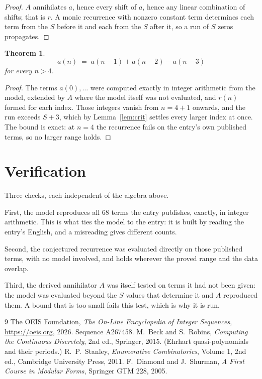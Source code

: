 \documentclass[11pt,a4paper]{article}
\theoremstyle{plain}
\newtheorem{theorem}{Theorem}
\theoremstyle{definition}
\begin{document}
\begin{proof}
$A$ annihilates $a$, hence every shift of $a$, hence any linear combination of shifts; that is
$r$. A monic recurrence with nonzero constant term determines each term from the $S$ before it
and each from the $S$ after it, so a run of $S$ zeros propagates.
\end{proof}

\begin{theorem}
\[
a(n)\;=\;a(n-1) + a(n-2) - a(n-3)
\]
for every $n>4$.
\end{theorem}

\begin{proof}
The terms $a(0),\dots$ were computed exactly in integer arithmetic from the model, extended by
$A$ where the model itself was not evaluated, and $r(n)$ formed for each index. Those integers
vanish from $n=4+1$ onwards, and the run exceeds $S+3$, which by
Lemma~\ref{lem:crit} settles every larger index at once. The bound is exact: at $n=4$ the recurrence fails on the entry's own published terms, so no larger range holds.
\end{proof}

\section{Verification}

Three checks, each independent of the algebra above.

First, the model reproduces all $68$ terms the entry publishes, exactly, in integer
arithmetic. This is what ties the model to the entry: it is built by reading the entry's
English, and a misreading gives different counts.

Second, the conjectured recurrence was evaluated directly on those published terms, with no
model involved, and holds wherever the proved range and the data overlap.

Third, the derived annihilator $A$ was itself tested on terms it had not been given: the model
was evaluated beyond the $S$ values that determine it and $A$ reproduced them. A bound that is
too small fails this test, which is why it is run.

\begin{thebibliography}{9}
 The OEIS Foundation, \emph{The On-Line Encyclopedia of Integer
Sequences}, \url{https://oeis.org}, 2026. Sequence A267458.
 M.~Beck and S.~Robins, \emph{Computing the Continuous Discretely},
2nd ed., Springer, 2015. (Ehrhart quasi-polynomials and their periods.)
 R.~P.~Stanley, \emph{Enumerative Combinatorics}, Volume 1, 2nd ed.,
Cambridge University Press, 2011.
 F.~Diamond and J.~Shurman, \emph{A First Course in Modular Forms},
Springer GTM 228, 2005.
\end{thebibliography}
\end{document}
